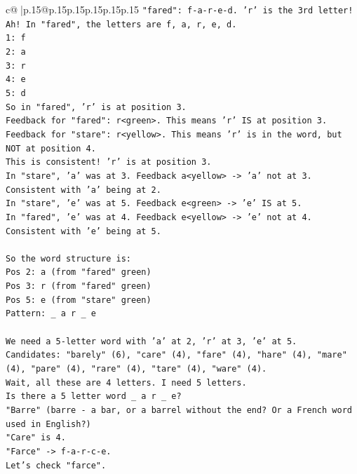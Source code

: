 \documentclass{article}
\begin{document}
{\begin{supertabular}{c@{$\;$}|p{.15\linewidth}@{}p{.15\linewidth}p{.15\linewidth}p{.15\linewidth}p{.15\linewidth}p{.15\linewidth}}
{{{\texttt{"fared": f{-}a{-}r{-}e{-}d. 'r' is the 3rd letter!} \\
\texttt{Ah! In "fared", the letters are f, a, r, e, d.} \\
\texttt{1: f} \\
\texttt{2: a} \\
\texttt{3: r} \\
\texttt{4: e} \\
\texttt{5: d} \\
\texttt{So in "fared", 'r' is at position 3.} \\
\texttt{Feedback for "fared": r<green>. This means 'r' IS at position 3.} \\
\texttt{Feedback for "stare": r<yellow>. This means 'r' is in the word, but NOT at position 4.} \\
\texttt{This is consistent! 'r' is at position 3.} \\
\texttt{In "stare", 'a' was at 3. Feedback a<yellow> {-}> 'a' not at 3. Consistent with 'a' being at 2.} \\
\texttt{In "stare", 'e' was at 5. Feedback e<green> {-}> 'e' IS at 5.} \\
\texttt{In "fared", 'e' was at 4. Feedback e<yellow> {-}> 'e' not at 4. Consistent with 'e' being at 5.} \\
\\ 
\texttt{So the word structure is:} \\
\texttt{Pos 2: a (from "fared" green)} \\
\texttt{Pos 3: r (from "fared" green)} \\
\texttt{Pos 5: e (from "stare" green)} \\
\texttt{Pattern: \_ a r \_ e} \\
\\ 
\texttt{We need a 5{-}letter word with 'a' at 2, 'r' at 3, 'e' at 5.} \\
\texttt{Candidates: "barely" (6), "care" (4), "fare" (4), "hare" (4), "mare" (4), "pare" (4), "rare" (4), "tare" (4), "ware" (4).} \\
\texttt{Wait, all these are 4 letters. I need 5 letters.} \\
\texttt{Is there a 5 letter word \_ a r \_ e?} \\
\texttt{"Barre" (barre {-} a bar, or a barrel without the end? Or a French word used in English?)} \\
\texttt{"Care" is 4.} \\
\texttt{"Farce" {-}> f{-}a{-}r{-}c{-}e.} \\
\texttt{Let's check "farce".} \\
}}}
\end{supertabular}}
\end{document}
